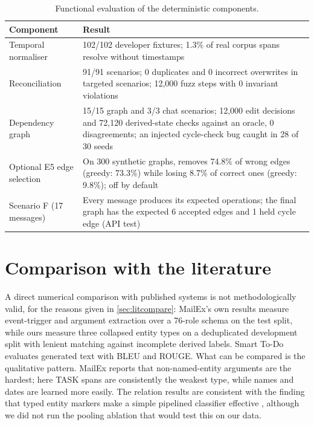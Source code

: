 \begin{table}[h]
\centering
\caption{Functional evaluation of the deterministic components.}
\label{tab:functional}
\footnotesize
\begin{tabularx}{\linewidth}{@{}p{34mm}L@{}}
\toprule
Component & Result \\
\midrule
Temporal normaliser & 102/102 developer fixtures; 1.3\% of real corpus spans resolve without timestamps \\
Reconciliation & 91/91 scenarios; 0 duplicates and 0 incorrect overwrites in targeted scenarios; 12,000 fuzz steps with 0 invariant violations \\
Dependency graph & 15/15 graph and 3/3 chat scenarios; 12,000 edit decisions and 72,120 derived-state checks against an oracle, 0 disagreements; an injected cycle-check bug caught in 28 of 30 seeds \\
Optional E5 edge selection & On 300 synthetic graphs, removes 74.8\% of wrong edges (greedy: 73.3\%) while losing 8.7\% of correct ones (greedy: 9.8\%); off by default \\
Scenario F (17 messages) & Every message produces its expected operations; the final graph has the expected 6 accepted edges and 1 held cycle edge (API test) \\
\bottomrule
\end{tabularx}
\end{table}

\section{Comparison with the literature}
A direct numerical comparison with published systems is not methodologically valid, for the reasons given in \cref{sec:litcompare}: MailEx's own results \citep{srivastava2023mailex} measure event-trigger and argument extraction over a 76-role schema on the test split, while ours measure three collapsed entity types on a deduplicated development split with lenient matching against incomplete derived labels. Smart To-Do \citep{mukherjee2020smarttodo} evaluates generated text with BLEU and ROUGE. What can be compared is the qualitative pattern. MailEx reports that non-named-entity arguments are the hardest; here TASK spans are consistently the weakest type, while names and dates are learned more easily. The relation results are consistent with the finding that typed entity markers make a simple pipelined classifier effective \citep{zhong2021pure}, although we did not run the pooling ablation that would test this on our data.

